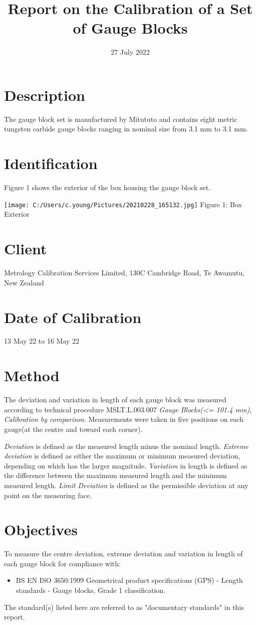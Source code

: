 \documentclass[IANZ]{MSLCalCert}
\begin{document}
\date{27 July 2022}
\title{Report on the Calibration of a Set of Gauge Blocks}
\maketitlepage
\justifying
\section{Description}
The gauge block set is manufactured by Mitututo and contains eight metric tungsten carbide gauge blocks ranging in nominal size from 3.1 mm to 3.1 mm.
\section{Identification}
Figure 1 shows the exterior of the box housing the gauge block set.\par
\texttt{[image: C:/Users/c.young/Pictures/20210228\_165132.jpg]}
Figure 1: Box Exterior\pagebreak
\section{Client}
Metrology Calibration Services Limited, 130C Cambridge Road, Te Awamutu, New Zealand
\section{Date of Calibration}
13 May 22 to 16 May 22
\section{Method}
The deviation and variation in length of each gauge block was measured according to technical procedure MSLT.L.003.007 \emph{Gauge Blocks(<= 101.4 mm), Calibration by comparison}.  Measurements were taken in five positions on each gauge(at the centre and toward each corner).\par \emph{Deviation} is defined as the measured length minus the nominal length. \emph{Extreme deviation} is defined as either the maximum or minimum measured deviation, depending on which has the larger magnitude.  \emph{Variation} in length is defined as the difference between the maximum measured length and the minimum measured length. \emph{Limit Deviation} is defined as the permissible deviation at any point on the measuring face.
\section{Objectives}
To measure the centre deviation, extreme deviation and variation in length of each gauge block for compliance with:\par 
\begin{itemize}
\item BS EN ISO 3650:1999 Geometrical product specifications (GPS) - Length standards - Gauge blocks, Grade 1 classification.\par
\end{itemize}
The standard(s) listed here are referred to as "documentary standards" in this report.
\end{document}
